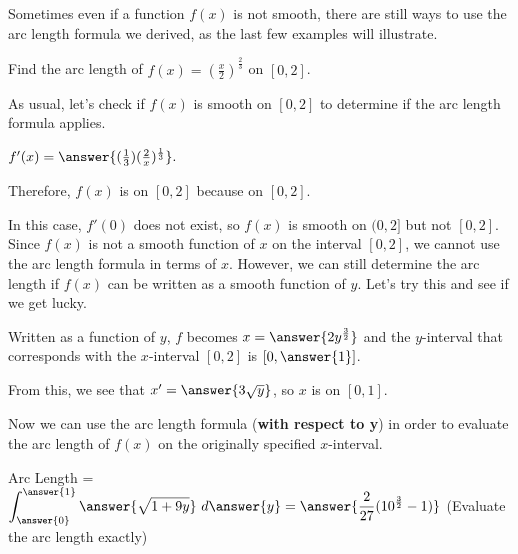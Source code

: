 \documentclass[handout,nooutcomes]{ximera}
\begin{document}
Sometimes even if a function $f(x)$ is not smooth, there are still ways to use the arc length formula we derived, as the last few examples will illustrate.


\begin{problem}
Find the arc length of $f(x) = \left(\frac{x}{2}\right)^{\frac{2}{3}}$ on $[0,2]$.  

As usual, let's check if $f(x)$ is smooth on $[0,2]$ to determine if the arc length formula applies.

$f'(x) = \answer{(\frac{1}{3})(\frac{2}{x})^{\frac{1}{3}}}.$ 

Therefore, $f(x)$ is  on $[0,2]$ because  on $[0,2]$.  

\begin{problem}
In this case, $f'(0)$ does not exist, so $f(x)$ is smooth on $(0,2]$ but not $[0,2]$.  Since $f(x)$ is not a smooth function of $x$ on the interval $[0,2]$, we cannot use the arc length formula in terms of $x$.  However, we can still determine the arc length if $f(x)$ can be written as a smooth function of $y$.  Let's try this and see if we get lucky.  

Written as a function of $y$, $f$ becomes $x = \answer{2y^{\frac{3}{2}}}$ and the $y$-interval that corresponds with the $x$-interval $[0,2]$ is $[0, \answer{1}]$.  

\begin{problem}
From this, we see that $x' = \answer{3\sqrt{y}}$, so $x$ is  on $[0,1]$.  

\begin{problem}
Now we can use the arc length formula (\textbf{with respect to y}) in order to evaluate the arc length of $f(x)$ on the originally specified $x$-interval. 

Arc Length = $\displaystyle\int_{\answer{0}}^{\answer{1}} \answer{\sqrt{1+9y}} \ d\answer{y} = \answer{\frac{2}{27}(10^{\frac{3}{2}}-1)}$ (Evaluate the arc length exactly)

\end{problem}
\end{problem}
\end{problem}
\end{problem}
\end{document}
